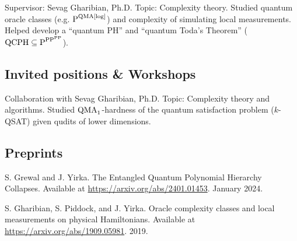 \documentclass[11pt,letterpaper,serif]{moderncv}
\begin{document}
{
	\begin{adjustwidth}{.25in}{}
		Supervisor: Sevag Gharibian, Ph.D. \newline
		Topic: Complexity theory. Studied quantum oracle classes  (e.g. {\scriptsize $\textup{P}^{\textup{QMA[log]}}$}) and complexity of simulating local measurements. Helped develop a ``quantum PH'' and ``quantum Toda's Theorem'' ({\scriptsize $\textup{QCPH}\subseteq \textup{P}^{\textup{PP}^{\textup{PP}}}$}).
	\end{adjustwidth}
}


\subsection{Invited positions \& Workshops}

{
}

{
	\begin{adjustwidth}{.25in}{}
		Collaboration with Sevag Gharibian, Ph.D. \newline
		Topic: Complexity theory and algorithms. Studied $\textup{QMA}_{1}$-hardness of the quantum satisfaction problem ($k$-QSAT) given qudits of lower dimensions.
	\end{adjustwidth}
}


\subsection{Preprints}
{ \leftskip 0.2in \parindent -0.2in %

S. Grewal and J. Yirka. The Entangled Quantum Polynomial Hierarchy Collapses. Available at \url{https://arxiv.org/abs/2401.01453}. January 2024.

S. Gharibian, S. Piddock, and J. Yirka. Oracle complexity classes and local measurements on physical Hamiltonians. Available at \url{https://arxiv.org/abs/1909.05981}. 2019.


} %
\end{document}
